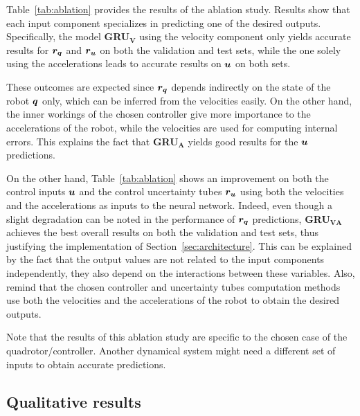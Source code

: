 Table~\ref{tab:ablation} provides the results of the ablation study.
Results show that each input component specializes in predicting one of the desired outputs.
Specifically, the model \textbf{GRU$\boldsymbol{_V}$} using the velocity component only yields accurate results for $\boldsymbol{r_q}$ and $\boldsymbol{r_u}$ on both the validation and test sets, while the one solely using the accelerations leads to accurate results on $\boldsymbol{u}$ on both sets.

These outcomes are expected since $\boldsymbol{r_q}$ depends indirectly on the state of the robot $\boldsymbol{q}$ only, which can be inferred from the velocities easily. 
On the other hand, the inner workings of the chosen controller give more importance to the accelerations of the robot, while the velocities are used for computing internal errors. 
This explains the fact that \textbf{GRU$\boldsymbol{_A}$} yields good results for the $\boldsymbol{u}$ predictions.

On the other hand, Table~\ref{tab:ablation} shows an improvement on both the control inputs $\boldsymbol{u}$ and the control uncertainty tubes $\boldsymbol{r_u}$ using both the velocities and the accelerations as inputs to the neural network. 
Indeed, even though a slight degradation can be noted in the performance of $\boldsymbol{r_q}$ predictions, \textbf{GRU$\boldsymbol{_{VA}}$} achieves the best overall results on both the validation and test sets, thus justifying the implementation of Section~\ref{sec:architecture}. 
This can be explained by the fact that the output values are not related to the input components independently, they also depend on the interactions between these variables. 
Also, remind that the chosen controller and uncertainty tubes computation methods use both the velocities and the accelerations of the robot to obtain the desired outputs.

Note that the results of this ablation study are specific to the chosen case of the quadrotor/controller.
Another dynamical system might need a different set of inputs to obtain accurate predictions.

\subsection{Qualitative results}

